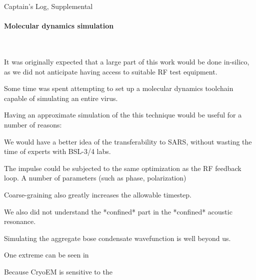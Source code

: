 \documentclass[paper.tex]{subfiles}
\begin{document}
\clearpage
{\Huge Captain's Log, Supplemental}\\

\paragraph{Molecular dynamics simulation}
\

It was originally expected that a large part of this work would be done in-silico, as we did not anticipate having access to suitable RF test equipment. 

Some time was spent attempting to set up a molecular dynamics toolchain capable of simulating an entire virus. 

Having an approximate simulation of the this technique would be useful for a number of reasons: 

We would have a better idea of the transferability to SARS, without wasting the time of experts with BSL-3/4 labs.

The impulse could be subjected to the same optimization as the RF feedback loop. A number of parameters (such as phase, polarization)



Coarse-graining also greatly increases the allowable timestep.

We also did not understand the *confined* part in the *confined* acoustic resonance.

Simulating the aggregate bose condensate wavefunction is well beyond us.











One extreme can be seen in 

Because CryoEM is sensitive to the 
\end{document}
